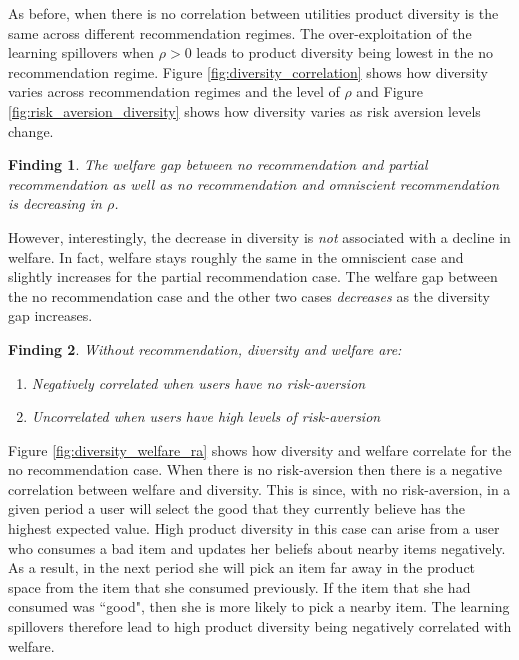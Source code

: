 \documentclass[sigconf]{acmart}
\newtheorem{finding}{Finding}
\begin{document}
As before, when there is no correlation between utilities product diversity is the same across different recommendation regimes. The over-exploitation of the learning spillovers when $\rho > 0$ leads to product diversity being lowest in the no recommendation regime. Figure \ref{fig:diversity_correlation} shows how diversity varies across recommendation regimes and the level of $\rho$ and Figure \ref{fig:risk_aversion_diversity} shows how diversity varies as risk aversion levels change. 

\begin{finding}\label{finding_welfare_gap}
The welfare gap between no recommendation and partial recommendation as well as no recommendation and omniscient recommendation is decreasing in $\rho$.
\end{finding}
However, interestingly, the decrease in diversity is \textit{not} associated with a decline in welfare. In fact, welfare stays roughly the same in the omniscient case and slightly increases for the partial recommendation case. The welfare gap between the no recommendation case and the other two cases \textit{decreases} as the diversity gap increases.

\begin{finding}\label{finding_diversity_welfare_corr}
Without recommendation, diversity and welfare are:
\begin{enumerate}
\item Negatively correlated when users have no risk-aversion
\item Uncorrelated when users have high levels of risk-aversion
\end{enumerate}
\end{finding}

Figure \ref{fig:diversity_welfare_ra} shows how diversity and welfare correlate for the no recommendation case. When there is no risk-aversion then there is a negative correlation between welfare and diversity. This is since, with no risk-aversion, in a given period a user will select the good that they currently believe has the highest expected value. High product diversity in this case can arise from a user who consumes a bad item and updates her beliefs about nearby items negatively. As a result, in the next period she will pick an item far away in the product space from the item that she consumed previously. If the item that she had consumed was ``good", then she is more likely to pick a nearby item. The learning spillovers therefore lead to high product diversity being negatively correlated with welfare.
\end{document}
